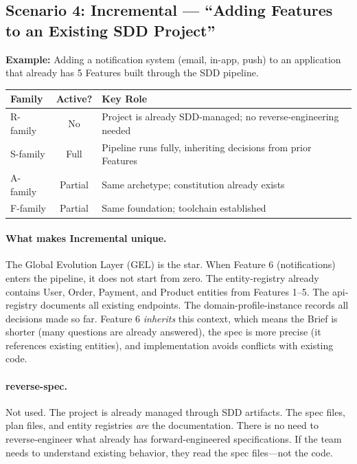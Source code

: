 \documentclass[11pt,a4paper,openright,twoside]{report}
\begin{document}
\subsection{Scenario 4: Incremental --- ``Adding Features to an Existing SDD Project''}
\label{sec:scenario-incremental}

\textbf{Example:} Adding a notification system (email, in-app, push) to an application that already has 5 Features built through the SDD pipeline.

\begin{center}
\begin{tabular}{lcp{8cm}}
\toprule
\textbf{Family} & \textbf{Active?} & \textbf{Key Role} \\
\midrule
R-family & No & Project is already SDD-managed; no reverse-engineering needed \\
S-family & Full & Pipeline runs fully, inheriting decisions from prior Features \\
A-family & Partial & Same archetype; constitution already exists \\
F-family & Partial & Same foundation; toolchain established \\
\bottomrule
\end{tabular}
\end{center}

\paragraph{What makes Incremental unique.}
The Global Evolution Layer (GEL) is the star. When Feature 6 (notifications) enters the pipeline, it does not start from zero. The entity-registry already contains User, Order, Payment, and Product entities from Features 1--5. The api-registry documents all existing endpoints. The domain-profile-instance records all decisions made so far. Feature 6 \emph{inherits} this context, which means the Brief is shorter (many questions are already answered), the spec is more precise (it references existing entities), and implementation avoids conflicts with existing code.

\paragraph{reverse-spec.}
Not used. The project is already managed through SDD artifacts. The spec files, plan files, and entity registries \emph{are} the documentation. There is no need to reverse-engineer what already has forward-engineered specifications. If the team needs to understand existing behavior, they read the spec files---not the code.
\end{document}
